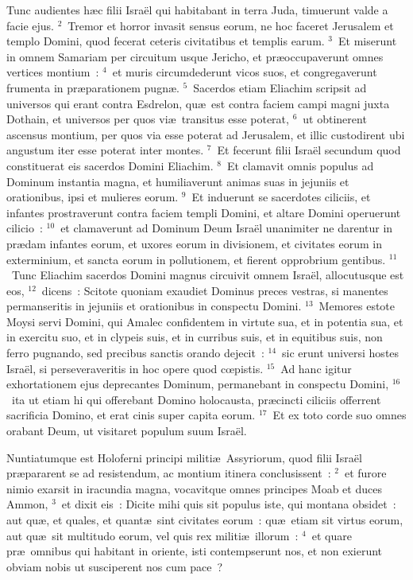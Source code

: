 \lettrine[lines=3,image=true,loversize=0.05,lraise=-0.03]{T}{}unc audientes h\ae c filii Isra\"el qui habitabant in terra Juda, timuerunt valde a facie ejus.
${}^{2}$~Tremor et horror invasit sensus eorum, ne hoc faceret Jerusalem et templo Domini, quod fecerat ceteris civitatibus et templis earum.
${}^{3}$~Et miserunt in omnem Samariam per circuitum usque Jericho, et pr\ae occupaverunt omnes vertices montium~:
${}^{4}$~et muris circumdederunt vicos suos, et congregaverunt frumenta in pr\ae parationem pugn\ae .
${}^{5}$~Sacerdos etiam Eliachim scripsit ad universos qui erant contra Esdrelon, qu\ae\ est contra faciem campi magni juxta Dothain, et universos per quos vi\ae\ transitus esse poterat,
${}^{6}$~ut obtinerent ascensus montium, per quos via esse poterat ad Jerusalem, et illic custodirent ubi angustum iter esse poterat inter montes.
${}^{7}$~Et fecerunt filii Isra\"el secundum quod constituerat eis sacerdos Domini Eliachim.
${}^{8}$~Et clamavit omnis populus ad Dominum instantia magna, et humiliaverunt animas suas in jejuniis et orationibus, ipsi et mulieres eorum.
${}^{9}$~Et induerunt se sacerdotes ciliciis, et infantes prostraverunt contra faciem templi Domini, et altare Domini operuerunt cilicio~:
${}^{10}$~et clamaverunt ad Dominum Deum Isra\"el unanimiter ne darentur in pr\ae dam infantes eorum, et uxores eorum in divisionem, et civitates eorum in exterminium, et sancta eorum in pollutionem, et fierent opprobrium gentibus.
${}^{11}$~Tunc Eliachim sacerdos Domini magnus circuivit omnem Isra\"el, allocutusque est eos,
${}^{12}$~dicens~: Scitote quoniam exaudiet Dominus preces vestras, si manentes permanseritis in jejuniis et orationibus in conspectu Domini.
${}^{13}$~Memores estote Moysi servi Domini, qui Amalec confidentem in virtute sua, et in potentia sua, et in exercitu suo, et in clypeis suis, et in curribus suis, et in equitibus suis, non ferro pugnando, sed precibus sanctis orando dejecit~:
${}^{14}$~sic erunt universi hostes Isra\"el, si perseveraveritis in hoc opere quod cœpistis.
${}^{15}$~Ad hanc igitur exhortationem ejus deprecantes Dominum, permanebant in conspectu Domini,
${}^{16}$~ita ut etiam hi qui offerebant Domino holocausta, pr\ae cincti ciliciis offerrent sacrificia Domino, et erat cinis super capita eorum.
${}^{17}$~Et ex toto corde suo omnes orabant Deum, ut visitaret populum suum Isra\"el.

\lettrine[lines=3,image=true,loversize=0.05,lraise=-0.03]{N}{}untiatumque est Holoferni principi militi\ae\ Assyriorum, quod filii Isra\"el pr\ae pararent se ad resistendum, ac montium itinera conclusissent~:
${}^{2}$~et furore nimio exarsit in iracundia magna, vocavitque omnes principes Moab et duces Ammon,
${}^{3}$~et dixit eis~: Dicite mihi quis sit populus iste, qui montana obsidet~: aut qu\ae , et quales, et quant\ae\ sint civitates eorum~: qu\ae\ etiam sit virtus eorum, aut qu\ae\ sit multitudo eorum, vel quis rex militi\ae\ illorum~:
${}^{4}$~et quare pr\ae\ omnibus qui habitant in oriente, isti contempserunt nos, et non exierunt obviam nobis ut susciperent nos cum pace~?


